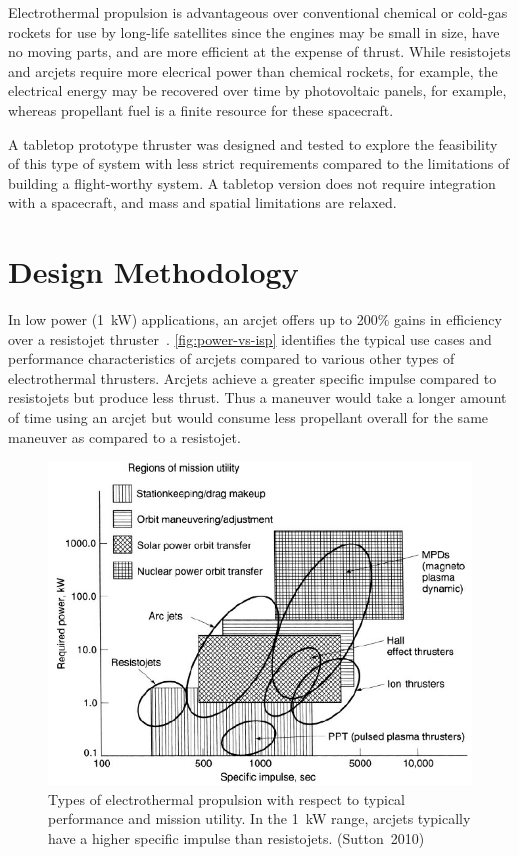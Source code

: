 \documentclass[journal]{IEEEtran}
\begin{document}
Electrothermal propulsion is advantageous over conventional chemical or cold-gas rockets for use by long-life satellites since the engines may be small in size, have no moving parts, and are more efficient at the expense of thrust.
While resistojets and arcjets require more elecrical power than chemical rockets, for example, the electrical energy may be recovered over time by photovoltaic panels, for example, whereas propellant fuel is a finite resource for these spacecraft.

A tabletop prototype thruster was designed and tested to explore the feasibility of this type of system with less strict requirements compared to the limitations of building a flight-worthy system.
A tabletop version does not require integration with a spacecraft, and mass and spatial limitations are relaxed.

\section{Design Methodology}
\label{sec:method}
In low power (\SI{1}{\kilo\watt}) applications, an arcjet offers up to 200\% gains in efficiency over a resistojet thruster~\cite{sutton}.
\autoref{fig:power-vs-isp} identifies the typical use cases and performance characteristics of arcjets compared to various other types of electrothermal thrusters.
Arcjets achieve a greater specific impulse compared to resistojets but produce less thrust.
Thus a maneuver would take a longer amount of time using an arcjet but would consume less propellant overall for the same maneuver as compared to a resistojet.
\begin{figure}[htp]
  \centering
  \includegraphics[width=\linewidth]{figs/power-vs-isp_sutton}
  \caption[Types of electrothermal propulsion]{Types of electrothermal propulsion with respect to typical performance and mission utility.
  In the \SI{1}{\kilo\watt} range, arcjets typically have a higher specific impulse than resistojets. (Sutton~2010)
\label{fig:power-vs-isp}}
\end{figure}
\end{document}
